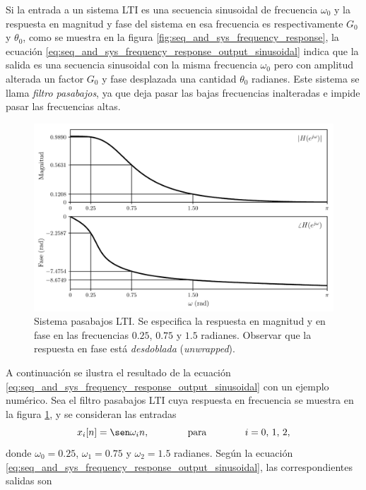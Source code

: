 \documentclass[a4paper]{report}
\begin{document}
Si la entrada a un sistema LTI es una secuencia sinusoidal de frecuencia \(\omega_0\) y la respuesta en magnitud y fase del sistema en esa frecuencia es respectivamente \(G_0\) y \(\theta_0\), como se muestra en la figura \ref{fig:seq_and_sys_frequency_response}, la ecuación \ref{eq:seq_and_sys_frequency_response_output_sinusoidal} indica que la salida es una secuencia sinusoidal con la misma frecuencia \(\omega_0\) pero con amplitud alterada un factor \(G_0\) y fase desplazada una cantidad \(\theta_0\) radianes. Este sistema se llama \emph{filtro pasabajos}, ya que deja pasar las bajas frecuencias inalteradas e impide pasar las frecuencias altas.

\begin{figure}[!htb]
 \begin{center}
 \includegraphics[width=\textwidth]{figuras/seq_and_sys_frequency_response_output_response.pdf}
 \caption{\label{fig:seq_and_sys_frequency_response_output_response} Sistema pasabajos LTI. Se especifica la respuesta en magnitud y en fase en las frecuencias \(0.25\), \(0.75\) y \(1.5\) radianes. Observar que la respuesta en fase está \emph{desdoblada} (\emph{unwrapped}).}
 \end{center}
\end{figure}
A continuación se ilustra el resultado de la ecuación \ref{eq:seq_and_sys_frequency_response_output_sinusoidal} con un ejemplo numérico. Sea el filtro pasabajos LTI cuya respuesta en frecuencia se muestra en la figura \ref{fig:seq_and_sys_frequency_response_output_response}, y se consideran las entradas
\[
 x_i[n]=\sen\omega_in,
 \qquad\qquad\textrm{para}\qquad\qquad i=0,\,1,\,2,
\]
donde \(\omega_0=0.25\), \(\omega_1=0.75\) y \(\omega_2=1.5\) radianes.
Según la ecuación \ref{eq:seq_and_sys_frequency_response_output_sinusoidal}, las correspondientes salidas son
\end{document}
